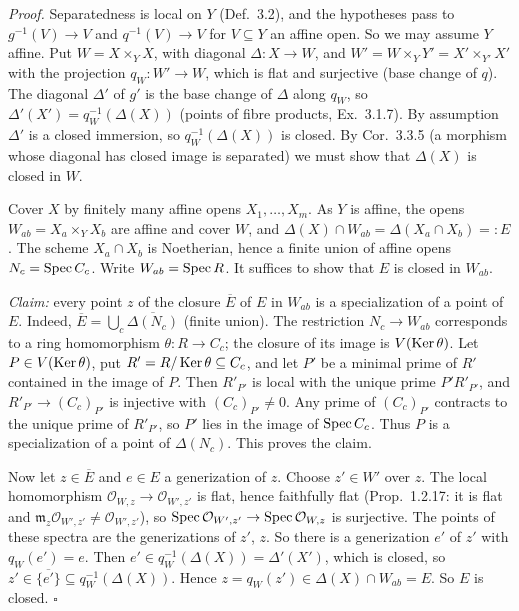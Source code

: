 \documentclass[11pt]{article}
\begin{document}
\emph{Proof.} Separatedness is local on $Y$ (Def.~3.2), and the hypotheses pass to $g^{-1}(V)\to V$ and $q^{-1}(V)\to V$ for $V\subseteq Y$ an affine open. So we may assume $Y$ affine. Put $W=X\times_YX$, with diagonal $\Delta:X\to W$, and $W'=W\times_YY'=X'\times_{Y'}X'$ with the projection $q_W:W'\to W$, which is flat and surjective (base change of $q$). The diagonal $\Delta'$ of $g'$ is the base change of $\Delta$ along $q_W$, so $\Delta'(X')=q_W^{-1}(\Delta(X))$ (points of fibre products, Ex.~3.1.7). By assumption $\Delta'$ is a closed immersion, so $q_W^{-1}(\Delta(X))$ is closed. By Cor.~3.3.5 (a morphism whose diagonal has closed image is separated) we must show that $\Delta(X)$ is closed in $W$.

Cover $X$ by finitely many affine opens $X_1,\dots,X_m$. As $Y$ is affine, the opens $W_{ab}=X_a\times_YX_b$ are affine and cover $W$, and $\Delta(X)\cap W_{ab}=\Delta(X_a\cap X_b)=:E$. The scheme $X_a\cap X_b$ is Noetherian, hence a finite union of affine opens $N_c=\operatorname{Spec} C_c$. Write $W_{ab}=\operatorname{Spec} R$. It suffices to show that $E$ is closed in $W_{ab}$.

\emph{Claim:} every point $z$ of the closure $\overline E$ of $E$ in $W_{ab}$ is a specialization of a point of $E$. Indeed, $\overline E=\bigcup_c\overline{\Delta(N_c)}$ (finite union). The restriction $N_c\to W_{ab}$ corresponds to a ring homomorphism $\theta:R\to C_c$; the closure of its image is $V(\operatorname{Ker}\theta)$. Let $P\in V(\operatorname{Ker}\theta)$, put $R'=R/\operatorname{Ker}\theta\subseteq C_c$, and let $P'$ be a minimal prime of $R'$ contained in the image of $P$. Then $R'_{P'}$ is local with the unique prime $P'R'_{P'}$, and $R'_{P'}\to(C_c)_{P'}$ is injective with $(C_c)_{P'}\ne0$. Any prime of $(C_c)_{P'}$ contracts to the unique prime of $R'_{P'}$, so $P'$ lies in the image of $\operatorname{Spec} C_c$. Thus $P$ is a specialization of a point of $\Delta(N_c)$. This proves the claim.

Now let $z\in\overline E$ and $e\in E$ a generization of $z$. Choose $z'\in W'$ over $z$. The local homomorphism $\mathcal O_{W,z}\to\mathcal O_{W',z'}$ is flat, hence faithfully flat (Prop.~1.2.17: it is flat and $\mathfrak m_z\mathcal O_{W',z'}\ne\mathcal O_{W',z'}$), so $\operatorname{Spec}\mathcal O_{W',z'}\to\operatorname{Spec}\mathcal O_{W,z}$ is surjective. The points of these spectra are the generizations of $z'$, $z$. So there is a generization $e'$ of $z'$ with $q_W(e')=e$. Then $e'\in q_W^{-1}(\Delta(X))=\Delta'(X')$, which is closed, so $z'\in\overline{\{e'\}}\subseteq q_W^{-1}(\Delta(X))$. Hence $z=q_W(z')\in\Delta(X)\cap W_{ab}=E$. So $E$ is closed. \hfill$\square$
\end{document}
